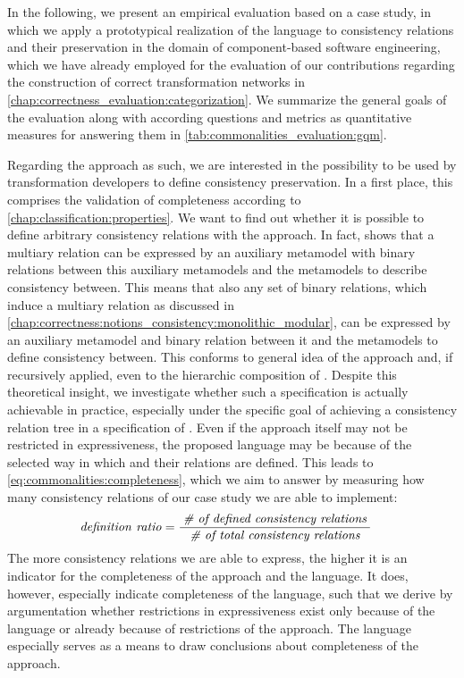 In the following, we present an empirical evaluation based on a case study, in which we apply a prototypical realization of the \commonalities language to consistency relations and their preservation in the domain of component-based software engineering, which we have already employed for the evaluation of our contributions regarding the construction of correct transformation networks in \autoref{chap:correctness_evaluation:categorization}.
We summarize the general goals of the evaluation along with according questions and metrics as quantitative measures for answering them in \autoref{tab:commonalities_evaluation:gqm}.

Regarding the \commonalities approach as such, we are interested in the possibility to be used by transformation developers to define consistency preservation.
In a first place, this comprises the validation of completeness according to \autoref{chap:classification:properties}.
We want to find out whether it is possible to define arbitrary consistency relations with the \commonalities approach. 
In fact, \citeauthor{stevens2020BidirectionalTransformationLarge-SoSym} shows that a multiary relation can be expressed by an auxiliary metamodel with binary relations between this auxiliary metamodels and the metamodels to describe consistency between.
This means that also any set of binary relations, which induce a multiary relation as discussed in \autoref{chap:correctness:notions_consistency:monolithic_modular}, can be expressed by an auxiliary metamodel and binary relation between it and the metamodels to define consistency between.
This conforms to general idea of the \commonalities approach and, if recursively applied, even to the hierarchic composition of \commonalities.
Despite this theoretical insight, we investigate whether such a specification is actually achievable in practice, especially under the specific goal of achieving a consistency relation tree in a specification of \commonalities.
Even if the \commonalities approach itself may not be restricted in expressiveness, the proposed \commonalities language may be because of the selected way in which \commonalities and their relations are defined.
This leads to \autoref{eq:commonalities:completeness}, which we aim to answer by measuring how many consistency relations of our case study we are able to implement:
\begin{align*}
    &
    \mathit{definition\ ratio} = \frac{\; \textit{\# of defined consistency relations} \;}{\; \textit{\# of total consistency relations} \;}
\end{align*}
The more consistency relations we are able to express, the higher it is an indicator for the completeness of the approach and the language. 
It does, however, especially indicate completeness of the \commonalities language, such that we derive by argumentation whether restrictions in expressiveness exist only because of the language or already because of restrictions of the \commonalities approach.
The language especially serves as a means to draw conclusions about completeness of the approach.

